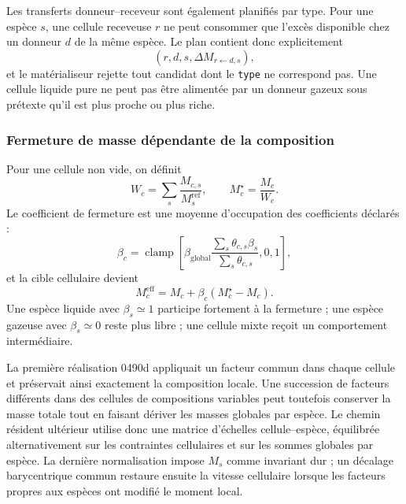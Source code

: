 \documentclass[11pt,a4paper]{article}
\begin{document}
Les transferts donneur--receveur sont également planifiés par type. Pour une espèce $s$, une cellule receveuse $r$ ne peut consommer que l'excès disponible chez un donneur $d$ de la même espèce. Le plan contient donc explicitement
\begin{equation}
  (r,d,s,\Delta M_{r\leftarrow d,s}),
\end{equation}
et le matérialiseur rejette tout candidat dont le \texttt{type} ne correspond pas. Une cellule liquide pure ne peut pas être alimentée par un donneur gazeux sous prétexte qu'il est plus proche ou plus riche.

\subsubsection{Fermeture de masse dépendante de la composition}

Pour une cellule non vide, on définit
\begin{equation}
  W_c=\sum_s\frac{M_{c,s}}{M_s^{\mathrm{ref}}},
  \qquad
  M_c^{\star}=\frac{M_c}{W_c}.
\end{equation}
Le coefficient de fermeture est une moyenne d'occupation des coefficients déclarés :
\begin{equation}
  \beta_c=\operatorname{clamp}\!\left[
  \beta_{\mathrm{global}}
  \frac{\sum_s\theta_{c,s}\beta_s}
       {\sum_s\theta_{c,s}},0,1\right],
\end{equation}
et la cible cellulaire devient
\begin{equation}
  M_c^{\mathrm{eff}}
  =M_c+\beta_c\left(M_c^{\star}-M_c\right).
\end{equation}
Une espèce liquide avec $\beta_s\simeq1$ participe fortement à la fermeture ; une espèce gazeuse avec $\beta_s\simeq0$ reste plus libre ; une cellule mixte reçoit un comportement intermédiaire.

La première réalisation 0490d appliquait un facteur commun dans chaque cellule et préservait ainsi exactement la composition locale. Une succession de facteurs différents dans des cellules de compositions variables peut toutefois conserver la masse totale tout en faisant dériver les masses globales par espèce. Le chemin résident ultérieur utilise donc une matrice d'échelles cellule--espèce, équilibrée alternativement sur les contraintes cellulaires et sur les sommes globales par espèce. La dernière normalisation impose $M_s$ comme invariant dur ; un décalage barycentrique commun restaure ensuite la vitesse cellulaire lorsque les facteurs propres aux espèces ont modifié le moment local.
\end{document}

